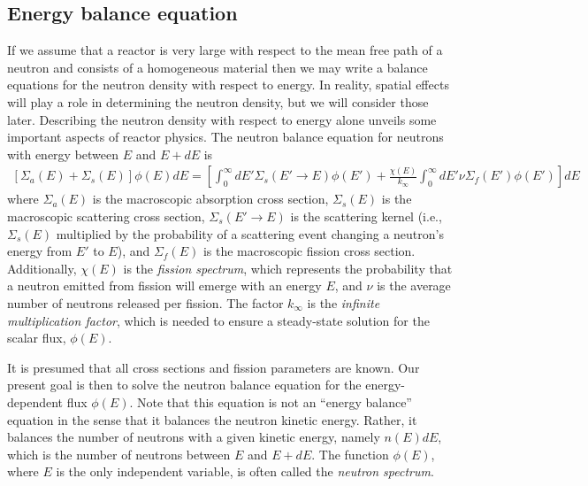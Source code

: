 \documentclass[11pt]{article}
\begin{document}
\subsection{Energy balance equation}
\label{sec:orgheadline26}
If we assume that a reactor is very large with respect to the mean free path of a neutron and consists of a homogeneous material then we may write a balance equations for the neutron density with respect to energy.  In reality, spatial effects will play a role in determining the neutron density, but we will consider those later.  Describing the neutron density with respect to energy alone unveils some important aspects of reactor physics.  The neutron balance equation for neutrons with energy between \(E\) and \(E+dE\) is
\begin{align}
  \left[ \Sigma_a(E) + \Sigma_s(E) \right] \phi(E) dE
  = \left[ \int_0^\infty dE' \Sigma_s(E' \rightarrow E ) \phi(E')
           + \frac{\chi(E)}{k_\infty} \int_0^\infty dE' \nu\Sigma_f(E') \phi(E') \right] dE
\end{align}
where \(\Sigma_a(E)\) is the macroscopic absorption cross section, \(\Sigma_s(E)\) is the macroscopic scattering cross section, \(\Sigma_s(E' \rightarrow E)\) is the scattering kernel (i.e., \(\Sigma_s(E)\) multiplied by the probability of a scattering event changing a neutron's energy from \(E'\) to \(E\)), and \(\Sigma_f(E)\) is the macroscopic fission cross section.  Additionally, \(\chi(E)\) is the \emph{fission spectrum}, which represents the probability that a neutron emitted from fission will emerge with an energy \(E\), and \(\nu\) is the average number of neutrons released per fission.  The factor \(k_\infty\) is the \emph{infinite multiplication factor}, which is needed to ensure a steady-state solution for the scalar flux, \(\phi(E)\).

It is presumed that all cross sections and fission parameters are known.  Our present goal is then to solve the neutron balance equation for the energy-dependent flux \(\phi(E)\).  Note that this equation is not an ``energy balance'' equation in the sense that it balances the neutron kinetic energy.  Rather, it balances the number of neutrons with a given kinetic energy, namely \(n(E)dE\), which is the number of neutrons between \(E\) and \(E+dE\).  The function \(\phi(E)\), where \(E\) is the only independent variable, is often called the \emph{neutron spectrum}.
\end{document}
